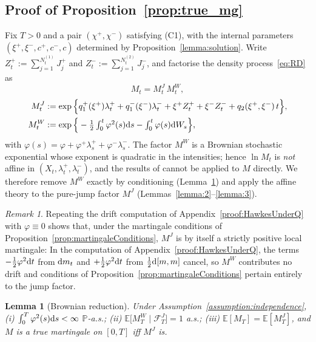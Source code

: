 \documentclass[11pt,a4paper]{article}
\numberwithin{equation}{section}
\newtheorem{lemma}[theorem]{Lemma}
\theoremstyle{remark}
\newtheorem{remark}[theorem]{Remark}
\theoremstyle{definition}
\newcommand{\E}{{\mathbb{E}}}
\newcommand{\p}{{\mathbb P}}
\newcommand{\dd}{{\rm d}}
\newcommand{\Fc}{\mathcal{F}}
\begin{document}
{
\subsection{Proof of Proposition~\ref{prop:true_mg}}\label{app:true_mg}

Fix $T>0$ and a pair $(\chi^{+},\chi^{-})$ satisfying (C1), with the internal parameters
$(\xi^{+},\xi^{-},c^{+},c^{-},c)$ determined by Proposition~\ref{lemma:solution}. Write
$Z^{+}_t:=\sum_{j=1}^{N^{(1)}_t}J^{+}_j$ and $Z^{-}_t:=\sum_{j=1}^{N^{(2)}_t}J^{-}_j$, and factorise
the density process~\eqref{eq:RD} as
\begin{equation}\label{eq:factor}
M_t=M^{J}_t\,M^{W}_t,
\end{equation}
\begin{align*}
M^{J}_t&:=\exp\Big\{q_1^{+}(\xi^{+})\lambda^{+}_t+q_1^{-}(\xi^{-})\lambda^{-}_t
+\xi^{+}Z^{+}_t+\xi^{-}Z^{-}_t+q_2(\xi^{+},\xi^{-})\,t\Big\},\\
M^{W}_t&:=\exp\Big\{-\tfrac12\textstyle\int_0^t\varphi^2(s)\dd s-\int_0^t\varphi(s)\dd W_s\Big\},
\end{align*}
with
$\varphi(s)=\varphi+\varphi^{+}\lambda^{+}_s+\varphi^{-}\lambda^{-}_s$.
The factor $M^{W}$ is a Brownian stochastic exponential whose exponent is quadratic in the intensities; hence $\ln M_t$ is \emph{not} affine in $(X_t,\lambda^{+}_t,\lambda^{-}_t)$, and the results of \cite{Mayerhofer2011} cannot be applied to $M$ directly. We therefore remove $M^{W}$ exactly by conditioning (Lemma~\ref{lemma:1}) and apply the affine theory to the pure-jump factor $M^{J}$ (Lemmas~\ref{lemma:2}--\ref{lemma:3}).

\begin{remark}
  \label{remark:6.1}
Repeating the drift computation of Appendix~\ref{proof:HawkesUnderQ} with $\varphi\equiv0$ shows that, under the
martingale conditions of Proposition~\ref{prop:martingaleConditions}, $M^{J}$ is by itself a strictly positive local martingale:
In the computation of Appendix~\ref{proof:HawkesUnderQ}, the terms $-\tfrac12\varphi^{2}\dd t$ from $\dd m_t$ and
$+\tfrac12\varphi^{2}\dd t$ from $\tfrac12\dd[m,m]$ cancel, so $M^{W}$ contributes no drift and
conditions of Proposition~\ref{prop:martingaleConditions} pertain entirely to the jump factor.
\end{remark}

\begin{lemma}[Brownian reduction]
  \label{lemma:1}
Under Assumption~\ref{assumption:independence},
\textup{(i)} $\int_0^T\varphi^2(s)\dd s<\infty$ $\p$-a.s.;
\textup{(ii)} $\E\big[M^{W}_T\mid\Fc^{J}_T\big]=1$ a.s.;
\textup{(iii)} $\E[M_T]=\E[M^{J}_T]$, and $M$ is a true martingale on $[0,T]$ iff $M^{J}$ is.
\end{lemma}

}
\end{document}
